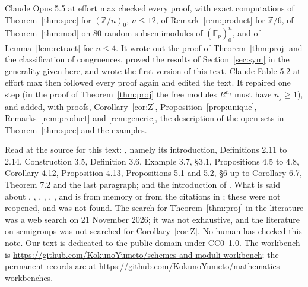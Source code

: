 \documentclass[11pt]{amsart}
\newcommand{\workbenchurl}{https://github.com/KokunoYumeto/schemes-and-moduli-workbench}
\newcommand{\recordurl}{https://github.com/KokunoYumeto/mathematics-workbenches}
\theoremstyle{remark}
\begin{document}
Claude Opus 5.5 at effort max checked every proof, with exact computations of Theorem~\ref{thm:spec} for $(\mathbb Z/n)_0$, $n\le12$, of Remark~\ref{rem:product} for $\mathbb Z/6$, of Theorem~\ref{thm:mod} on 80 random subsemimodules of $(\mathbb F_p)_0^n$, and of Lemma~\ref{lem:retract} for $n\le4$. It wrote out the proof of Theorem~\ref{thm:proj} and the classification of congruences, proved the results of Section~\ref{sec:sym} in the generality given here, and wrote the first version of this text. Claude Fable 5.2 at effort max then followed every proof again and edited the text. It repaired one step (in the proof of Theorem~\ref{thm:proj} the free modules $R^{n_j}$ must have $n_j\ge1$), and added, with proofs, Corollary~\ref{cor:Z}, Proposition~\ref{prop:unique}, Remarks~\ref{rem:product} and \ref{rem:generic}, the description of the open sets in Theorem~\ref{thm:spec} and the examples.

Read at the source for this text: \cite{FGJM}, namely its introduction, Definitions 2.11 to 2.14, Construction 3.5, Definition 3.6, Example 3.7, \S3.1, Propositions 4.5 to 4.8, Corollary 4.12, Proposition 4.13, Propositions 5.1 and 5.2, \S6 up to Corollary 6.7, Theorem 7.2 and the last paragraph; and the introduction of \cite{CCs}. What is said about \cite{Golan}, \cite{Clifford}, \cite{Howie}, \cite{Birkhoff}, \cite{HK}, \cite{BH}, \cite{Rowen} and \cite{CC} is from memory or from the citations in \cite{FGJM}; these were not reopened, and \cite{FM} was not found. The search for Theorem~\ref{thm:proj} in the literature was a web search on 21 November 2026; it was not exhaustive, and the literature on semigroups was not searched for Corollary~\ref{cor:Z}. No human has checked this note. Our text is dedicated to the public domain under CC0~1.0. The workbench is \expandafter\url\expandafter{\workbenchurl}; the permanent records are at \expandafter\url\expandafter{\recordurl}.
\end{document}

